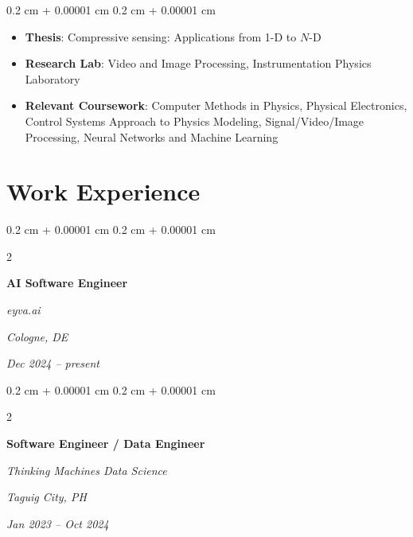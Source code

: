 \documentclass[10pt, a4paper]{article}
\newenvironment{highlights}{
    \begin{itemize}[
        topsep=0.10 cm,
        parsep=0.10 cm,
        partopsep=0pt,
        itemsep=0pt,
        leftmargin=0.4 cm + 10pt
    ]
}{
    \end{itemize}
} %
\newenvironment{onecolentry}{
    \begin{adjustwidth}{
        0.2 cm + 0.00001 cm
    }{
        0.2 cm + 0.00001 cm
    }
}{
    \end{adjustwidth}
} %
\newenvironment{twocolentry}[2][]{
    \onecolentry
    \def\secondColumn{#2}
    \setcolumnwidth{\fill, 4.5 cm}
    \begin{paracol}{2}
}{
    \switchcolumn \raggedleft \secondColumn
    \end{paracol}
    \endonecolentry
} %
\begin{document}
        \vspace{0.10 cm}
        \begin{onecolentry}
            \begin{highlights}
                \item \textbf{Thesis}: Compressive sensing: Applications from 1-D to $N$-D
                \item \textbf{Research Lab}: Video and Image Processing, Instrumentation Physics Laboratory
                \item \textbf{Relevant Coursework}: Computer Methods in Physics, Physical Electronics,  Control Systems Approach to Physics Modeling, Signal/Video/Image Processing, Neural Networks and Machine Learning

            \end{highlights}
        \end{onecolentry}



    
    \section{Work Experience}



        
        \begin{twocolentry}{
        \textit{Cologne, DE}    
            
        \textit{Dec 2024 – present}}
            \textbf{AI Software Engineer}
            
            \textit{eyva.ai}
        \end{twocolentry}



        \vspace{0.2 cm}

        \begin{twocolentry}{
        \textit{Taguig City, PH}    
            
        \textit{Jan 2023 – Oct 2024}}
            \textbf{Software Engineer / Data Engineer}
            
            \textit{Thinking Machines Data Science}
        \end{twocolentry}
\end{document}
